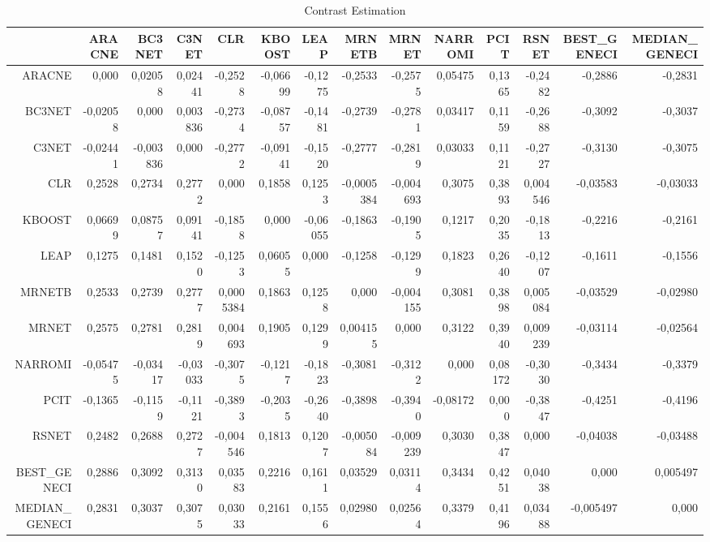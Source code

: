 \documentclass[a4paper,10pt]{article}
\begin{document}
\begin{landscape}
\begin{table}[!htp]
\centering\tiny
\caption{Contrast Estimation}
\begin{tabular}{
|r|r|r|r|r|r|r|r|r|r|r|r|r|r|}
\hline
 &ARACNE&BC3NET&C3NET&CLR&KBOOST&LEAP&MRNETB&MRNET&NARROMI&PCIT&RSNET&BEST_GENECI&MEDIAN_GENECI\\
\hline
ARACNE&0,000&0,02058&0,02441&-0,2528&-0,06699&-0,1275&-0,2533&-0,2575&0,05475&0,1365&-0,2482&-0,2886&-0,2831\\
\hline
BC3NET&-0,02058&0,000&0,003836&-0,2734&-0,08757&-0,1481&-0,2739&-0,2781&0,03417&0,1159&-0,2688&-0,3092&-0,3037\\
\hline
C3NET&-0,02441&-0,003836&0,000&-0,2772&-0,09141&-0,1520&-0,2777&-0,2819&0,03033&0,1121&-0,2727&-0,3130&-0,3075\\
\hline
CLR&0,2528&0,2734&0,2772&0,000&0,1858&0,1253&-0,0005384&-0,004693&0,3075&0,3893&0,004546&-0,03583&-0,03033\\
\hline
KBOOST&0,06699&0,08757&0,09141&-0,1858&0,000&-0,06055&-0,1863&-0,1905&0,1217&0,2035&-0,1813&-0,2216&-0,2161\\
\hline
LEAP&0,1275&0,1481&0,1520&-0,1253&0,06055&0,000&-0,1258&-0,1299&0,1823&0,2640&-0,1207&-0,1611&-0,1556\\
\hline
MRNETB&0,2533&0,2739&0,2777&0,0005384&0,1863&0,1258&0,000&-0,004155&0,3081&0,3898&0,005084&-0,03529&-0,02980\\
\hline
MRNET&0,2575&0,2781&0,2819&0,004693&0,1905&0,1299&0,004155&0,000&0,3122&0,3940&0,009239&-0,03114&-0,02564\\
\hline
NARROMI&-0,05475&-0,03417&-0,03033&-0,3075&-0,1217&-0,1823&-0,3081&-0,3122&0,000&0,08172&-0,3030&-0,3434&-0,3379\\
\hline
PCIT&-0,1365&-0,1159&-0,1121&-0,3893&-0,2035&-0,2640&-0,3898&-0,3940&-0,08172&0,000&-0,3847&-0,4251&-0,4196\\
\hline
RSNET&0,2482&0,2688&0,2727&-0,004546&0,1813&0,1207&-0,005084&-0,009239&0,3030&0,3847&0,000&-0,04038&-0,03488\\
\hline
BEST_GENECI&0,2886&0,3092&0,3130&0,03583&0,2216&0,1611&0,03529&0,03114&0,3434&0,4251&0,04038&0,000&0,005497\\
\hline
MEDIAN_GENECI&0,2831&0,3037&0,3075&0,03033&0,2161&0,1556&0,02980&0,02564&0,3379&0,4196&0,03488&-0,005497&0,000\\
\hline

\end{tabular}
\end{table}

\newpage


\end{landscape}
\end{document}
